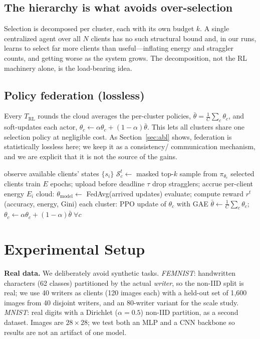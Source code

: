 \documentclass[conference]{IEEEtran}
\begin{document}
\subsection{The hierarchy is what avoids over-selection}
Selection is decomposed per cluster, each with its own budget $k$. A single
centralized agent over all $N$ clients has no such structural bound and, in our
runs, learns to select far more clients than useful---inflating energy and
straggler counts, and getting worse as the system grows. The decomposition, not
the RL machinery alone, is the load-bearing idea.

\subsection{Policy federation (lossless)}
Every $T_{\text{RL}}$ rounds the cloud averages the per-cluster policies,
$\bar{\theta}=\tfrac1C\sum_c\theta_c$, and soft-updates each actor,
$\theta_c\leftarrow\alpha\theta_c+(1-\alpha)\bar{\theta}$. This lets all clusters
share one selection policy at negligible cost. As Section~\ref{sec:abl} shows,
federation is statistically lossless here; we keep it as a consistency/
communication mechanism, and we are explicit that it is not the source of the
gains.

\begin{algorithm}[t]
\caption{HELM round $t$}
\label{alg:helm}
\begin{algorithmic}[1]
  \STATE observe available clients' states $\{s_i\}$
  \STATE $\mathcal{S}_c^t \leftarrow$ masked top-$k$ sample from $\pi_{\theta_c}$
  \STATE selected clients train $E$ epochs; upload before deadline $\tau$
  \STATE drop stragglers; accrue per-client energy $E_i$
\ENDFOR
\STATE cloud: $\theta_{\text{model}} \leftarrow$ FedAvg(arrived updates)
\STATE evaluate; compute reward $r^t$ (accuracy, energy, Gini)
\STATE each cluster: PPO update of $\theta_c$ with GAE
  \STATE $\bar{\theta}\leftarrow\frac1C\sum_c\theta_c$;\;
         $\theta_c\leftarrow\alpha\theta_c+(1-\alpha)\bar{\theta}\;\forall c$
\ENDIF
\end{algorithmic}
\end{algorithm}

\section{Experimental Setup}
\textbf{Real data.} We deliberately avoid synthetic tasks. \emph{FEMNIST}:
handwritten characters (62 classes) partitioned by the actual \emph{writer}, so
the non-IID split is real; we use 40 writers as clients (120 images each) with a
held-out set of 1{,}600 images from 40 disjoint writers, and an 80-writer variant
for the scale study. \emph{MNIST}: real digits with a Dirichlet ($\alpha{=}0.5$)
non-IID partition, as a second dataset. Images are $28{\times}28$; we test both an
MLP and a CNN backbone so results are not an artifact of one model.
\end{document}
